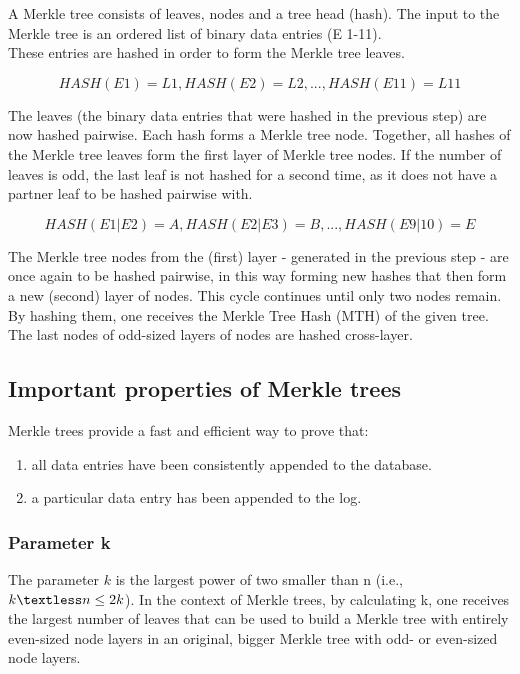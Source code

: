 \documentclass{article}
\begin{document}
	A Merkle tree consists of leaves, nodes and a tree head (hash). The input to the Merkle tree is an ordered list of binary data entries (E 1-11). \\
	
	These entries are hashed in order to form the Merkle tree leaves.
	
	\[HASH(E1)=L1, HASH(E2)=L2, ..., HASH(E11)=L11\]
	
	The leaves (the binary data entries that were hashed in the previous step) are now hashed pairwise. Each hash forms a Merkle tree node. Together, all hashes of the Merkle tree leaves form the first layer of Merkle tree nodes. If the number of leaves is odd, the last leaf is not hashed for a second time, as it does not have a partner leaf to be hashed pairwise with.
	
	\[HASH(E1|E2)=A, HASH(E2|E3)=B, ..., HASH(E9|10)=E\]
	
	The Merkle tree nodes from the (first) layer - generated in the previous step - are once again to be hashed pairwise, in this way forming new hashes that then form a new (second) layer of nodes. This cycle continues until only two nodes remain. By hashing them, one receives the Merkle Tree Hash (MTH) of the given tree. The last nodes of odd-sized layers of nodes are hashed cross-layer. \\
	
	\subsection{Important properties of Merkle trees}
	Merkle trees provide a fast and efficient way to prove that:
	\begin{enumerate}
		\item all data entries have been consistently appended to the database.
		\item a particular data entry has been appended to the log.
	\end{enumerate}
		
		\subsubsection{Parameter k}
		The parameter $ k $ is the largest power of two smaller than n (i.e.,$  k \textless n \leq 2k $). In the context of Merkle trees, by calculating k, one receives the largest number of leaves that can be used to build a Merkle tree with entirely even-sized node layers in an original, bigger Merkle tree with odd- or even-sized node layers.
		
\end{document}

